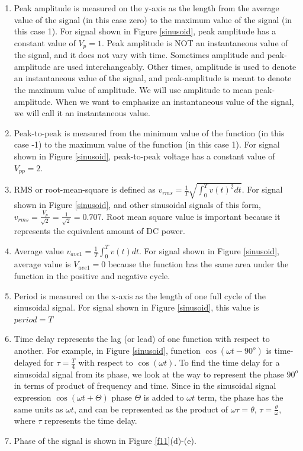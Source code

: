 \documentclass{ximera}
\begin{document}
\begin{enumerate}
\item Peak amplitude is measured on the y-axis as the length from the average value of the signal (in this case zero) to the maximum value of the signal (in this case 1). For signal shown in Figure \ref{sinusoid}, peak  amplitude has a constant value of $V_p=1$. Peak amplitude is NOT an instantaneous value of the signal, and it does not vary with  time. Sometimes amplitude and peak-amplitude are used interchangeably. Other times,  amplitude is used to denote an instantaneous value of the signal, and peak-amplitude is meant to denote the maximum value of amplitude. We will use amplitude to mean peak-amplitude. When we want to emphasize an instantaneous value of the signal, we will call it an instantaneous value.
\item Peak-to-peak is measured from the minimum value of the function (in this case -1) to the maximum value of the function (in this case 1).  For signal shown in Figure \ref{sinusoid}, peak-to-peak voltage has a constant value of  $V_{pp}=2$.
\item RMS or root-mean-square is defined as $v_{rms}=\frac{1}{T} \sqrt{\int_0^T v(t)^2 dt}$. For signal shown in Figure \ref{sinusoid}, and other sinusoidal signals of this form,  $v_{rms}=\frac{V_p}{\sqrt{2}}=\frac{1}{\sqrt{2}}=0.707$. Root mean square value  is important because it represents the equivalent amount of DC power.  
\item Average value $v_{ave1}=\frac{1}{T} \int_0^T v(t) dt$. For signal shown in Figure \ref{sinusoid}, average value is $V_{ave1}=0$ because the function has the same area under the function in the  positive and negative cycle. 
\item Period is measured on the x-axis as the length of one full cycle of the sinusoidal signal. For signal shown in Figure \ref{sinusoid}, this value is $period=T$
\item Time delay represents the lag (or lead) of one function with respect to another. For example, in Figure \ref{sinusoid}, function $ \cos(\omega t - 90^o)$ is time-delayed for $\tau = \frac{T}{4}$ with respect to $\cos (\omega t)$. To find the time delay for  a sinusoidal signal from its phase, we look at the way to represent the phase $90^o$ in terms of product of frequency and time. Since in the sinusoidal signal expression $\cos (\omega t + \Theta)$  phase $\Theta$ is added to $\omega t$ term, the phase has the same units as $\omega t$, and can be represented as the product of $\omega \tau = \theta$, $\tau = \frac{\theta}{\omega}$, where $\tau$ represents the time delay.
\item Phase of the signal is shown in Figure \ref{f11}(d)-(e).
\end{enumerate}
\end{document}
